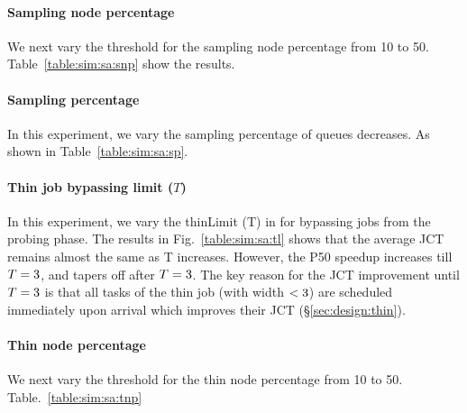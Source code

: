 \vspace{-0.05in}
\paragraph{Sampling node percentage} We next vary the threshold for the
sampling node percentage from 10 to 50. Table~\ref{table:sim:sa:snp}
show the results.
\fi

\paragraph{Sampling percentage} In this experiment, we vary the sampling percentage 
of queues decreases. As shown in Table~\ref{table:sim:sa:sp}. 
\fi

\paragraph{Thin job bypassing limit ($T$)}
In this experiment, we vary the thinLimit (T) in \slearn for bypassing jobs from
the probing phase. The results in Fig.~\ref{table:sim:sa:tl} shows that the
average JCT remains almost the same as T increases.  However, the P50 speedup
increases till $T = {3}$, and tapers off after $T = {3}$.
The key reason for the JCT improvement until $T = {3}$ is that
all tasks of the thin job (with width $< {3}$) are scheduled immediately
upon arrival which improves their JCT (\S\ref{sec:design:thin}).
\fi

\paragraph{Thin node percentage} We next vary the threshold for
the thin node percentage from 10 to 50. Table.~\ref{table:sim:sa:tnp}
\fi
